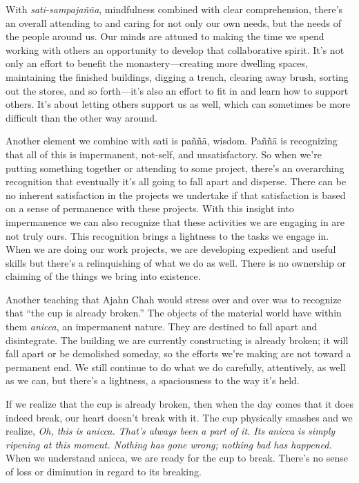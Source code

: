 With \emph{sati-sampajañña}, mindfulness combined with clear 
comprehension, there's an overall attending to and caring for not only 
our own needs, but the needs of the people around us. Our minds are 
attuned to making the time we spend working with others an opportunity 
to develop that collaborative spirit. It's not only an effort to 
benefit the monastery---creating more dwelling spaces, maintaining the 
finished buildings, digging a trench, clearing away brush, sorting out 
the stores, and so forth---it's also an effort to fit in and learn how 
to support others. It's about letting others support us as well, which 
can sometimes be more difficult than the other way around.

Another element we combine with sati is paññā, wisdom. Paññā is 
recognizing that all of this is impermanent, not-self, and 
unsatisfactory. So when we're putting something together or attending 
to some project, there's an overarching recognition that eventually 
it's all going to fall apart and disperse. There can be no inherent 
satisfaction in the projects we undertake if that satisfaction is based 
on a sense of permanence with these projects. With this insight into 
impermanence we can also recognize that these activities we are 
engaging in are not truly ours. This recognition brings a lightness to 
the tasks we engage in. When we are doing our work projects, we are 
developing expedient and useful skills but there's a relinquishing of 
what we do as well. There is no ownership or claiming of the things we 
bring into existence.

Another teaching that Ajahn Chah would stress over and over was to 
recognize that ``the cup is already broken.'' The objects of the 
material world have within them \emph{anicca}, an impermanent nature. 
They are destined to fall apart and disintegrate. The building we are 
currently constructing is already broken; it will fall apart or be 
demolished someday, so the efforts we're making are not toward a 
permanent end. We still continue to do what we do carefully, 
attentively, as well as we can, but there's a lightness, a spaciousness 
to the way it's held.

If we realize that the cup is already broken, then when the day comes 
that it does indeed break, our heart doesn't break with it. The cup 
physically smashes and we realize, \emph{Oh, this is anicca. That's 
always been a part of it. Its anicca is simply ripening at this moment. 
Nothing has gone wrong; nothing bad has happened.} When we understand 
anicca, we are ready for the cup to break. There's no sense of loss or 
diminution in regard to its breaking.

